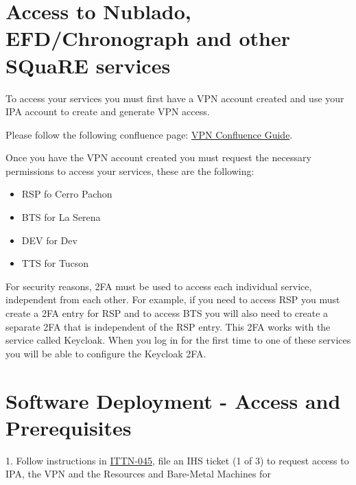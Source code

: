   




\newpage
\section{Access to Nublado, EFD/Chronograph and other SQuaRE services}
\label{sec:Nublado}

To access your services you must first have a VPN account created and use your IPA account to create and generate VPN access. 

Please follow the following confluence page: \href{https://confluence.lsstcorp.org/display/IT/Rubin+VPN+user%27s+guide}{VPN Confluence Guide}.

Once you have the VPN account created you must request the necessary permissions to access your services, these are the following:

\begin{itemize}
  \item RSP fo Cerro Pachon
  \item BTS for La Serena
  \item DEV for Dev
  \item TTS for Tucson
\end{itemize}

For security reasons, 2FA must be used to access each individual service, independent from each other. For example, if you need to access RSP you must create a 2FA entry for RSP and to access BTS you will also need to create a separate 2FA that is independent of the RSP entry. This 2FA works with the service called Keycloak. When you log in for the first time to one of these services you will be able to configure the Keycloak 2FA.

\newpage
\section{Software Deployment - Access and Prerequisites}

1. Follow instructions in \href{https://ittn-045.lsst.io}{ITTN-045}, file an IHS ticket (1 of 3) to request access to IPA, the VPN and the Resources and Bare-Metal Machines for

